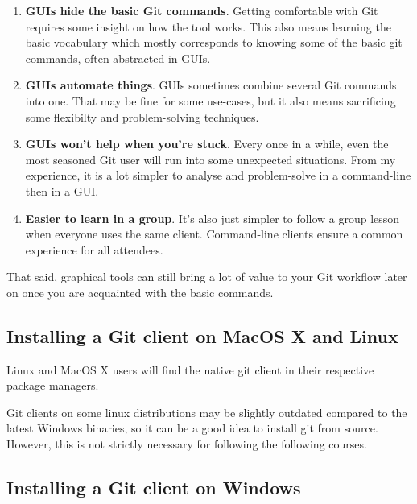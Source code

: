 \documentclass{../../common/tufte-latex/tufte-handout}
\begin{document}
\begin{enumerate} 
 \item{\textbf{GUIs hide the basic Git commands}. Getting comfortable with Git requires some insight on how the tool works. This also means learning the basic vocabulary which mostly corresponds to knowing some of the basic git commands, often abstracted in GUIs.}
 \item{\textbf{GUIs automate things}.  GUIs sometimes combine several Git commands into one.  That may be fine for some use-cases, but it also means sacrificing some flexibilty and problem-solving techniques.}
 \item{\textbf{GUIs won't help when you're stuck}.  Every once in a while, even the most seasoned Git user will run into some unexpected situations. From my experience, it is a lot simpler to analyse and problem-solve in a command-line then in a GUI.}
 \item{\textbf{Easier to learn in a group}. It's also just simpler to follow a group lesson when everyone uses the same client. Command-line clients ensure a common experience for all attendees.}
\end{enumerate}

That said, graphical tools can still bring a lot of value to your Git workflow later on once you are acquainted with the basic commands.

\subsection{Installing a Git client on MacOS X and Linux}

Linux and MacOS X users will find the native git client in their respective package managers.

Git clients on some linux distributions may be slightly outdated compared to the latest Windows binaries,  so it can be a good idea to install git from source. However, this is not strictly necessary for following the following courses.

\subsection{Installing a Git client on Windows}\label{sec:preparation}
\end{document}
